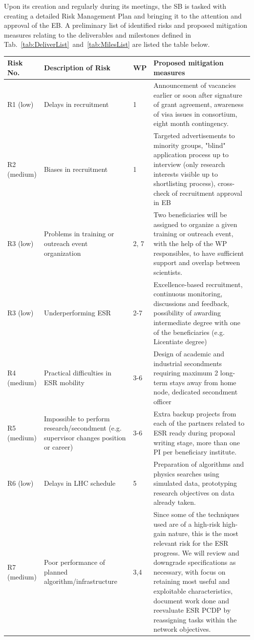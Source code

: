 Upon its creation and regularly during its meetings, the SB is tasked with creating a detailed Risk Management Plan and bringing it to the attention and approval of the EB. 
A preliminary list of identified risks and proposed mitigation measures relating to the deliverables and milestones defined in Tab.~\ref{tab:DeliverList}~and~\ref{tab:MilesList} are listed the table below.

\begin{center}\scriptsize
\begin{tabular}{p{10mm}p{65mm}p{5mm}p{85mm}}
\toprule
Risk No. & Description of Risk & WP & Proposed mitigation measures \\
\midrule
R1 (low) & Delays in recruitment & 1 & Announcement of vacancies earlier or soon after signature of grant agreement, awareness of visa issues in consortium, eight month contingency. \\
R2 (medium) & Biases in recruitment & 1 & Targeted advertisements to minority groups, "blind" application process up to interview (only research interests visible up to shortlisting process), cross-check of recruitment approval in EB\\
R3 (low) & Problems in training or outreach event organization & 2, 7 & Two beneficiaries will be assigned to organize a given training or outreach event, 
with the help of the WP responsibles, to have sufficient support and overlap between scientists.\\
R3 (low) & Underperforming ESR & 2-7 & Excellence-based recruitment, continuous monitoring, discussions and feedback, possibility of awarding intermediate degree with one of the beneficiaries (e.g. Licentiate degree) \\
R4 (medium) & Practical difficulties in ESR mobility & 3-6 & Design of academic and industrial secondments requiring maximum 2 long-term stays away from home node, dedicated secondment officer \\
R5 (medium) & Impossible to perform research/secondment (e.g. supervisor changes position or career) & 3-6 & Extra backup projects from each of the partners related to ESR ready during proposal writing stage, more than one PI per beneficiary institute.\\
R6 (low) & Delays in LHC schedule & 5 & Preparation of algorithms and physics searches using simulated data, prototyping research objectives on data already taken.\\
R7 (medium) & Poor performance of planned algorithm/infrastructure & 3,4 & Since some of the techniques used are of a high-risk high-gain nature, this is the most relevant risk for the ESR progress. We will review and downgrade specifications as necessary, with focus on retaining most useful and exploitable characteristics, document work done and reevaluate ESR PCDP by reassigning tasks within the network objectives.\\
\bottomrule
\end{tabular}
\end{center}
